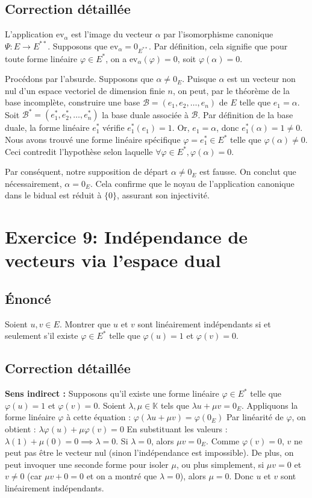 \documentclass{report}
\begin{document}
\section*{Correction détaillée}
L'application $\text{ev}_\alpha$ est l'image du vecteur $\alpha$ par l'isomorphisme canonique $\Psi : E \to E^{**}$.
Supposons que $\text{ev}_\alpha = 0_{E^{**}}$.
Par définition, cela signifie que pour toute forme linéaire $\varphi \in E^*$, on a $\text{ev}_\alpha(\varphi) = 0$, soit $\varphi(\alpha) = 0$.

Procédons par l'absurde. Supposons que $\alpha \neq 0_E$.
Puisque $\alpha$ est un vecteur non nul d'un espace vectoriel de dimension finie $n$, on peut, par le théorème de la base incomplète, construire une base $\mathcal{B} = (e_1, e_2, \dots, e_n)$ de $E$ telle que $e_1 = \alpha$.
Soit $\mathcal{B}^* = (e_1^*, e_2^*, \dots, e_n^*)$ la base duale associée à $\mathcal{B}$.
Par définition de la base duale, la forme linéaire $e_1^*$ vérifie $e_1^*(e_1) = 1$.
Or, $e_1 = \alpha$, donc $e_1^*(\alpha) = 1 \neq 0$.
Nous avons trouvé une forme linéaire spécifique $\varphi = e_1^* \in E^*$ telle que $\varphi(\alpha) \neq 0$.
Ceci contredit l'hypothèse selon laquelle $\forall \varphi \in E^*, \varphi(\alpha) = 0$.

Par conséquent, notre supposition de départ $\alpha \neq 0_E$ est fausse.
On conclut que nécessairement, $\alpha = 0_E$.
Cela confirme que le noyau de l'application canonique dans le bidual est réduit à $\{0\}$, assurant son injectivité.


\newpage
\chapter*{Exercice 9: Indépendance de vecteurs via l'espace dual}
\section*{Énoncé}
Soient $u, v \in E$. Montrer que $u$ et $v$ sont linéairement indépendants si et seulement s'il existe $\varphi \in E^*$ telle que $\varphi(u) = 1$ et $\varphi(v) = 0$.


\section*{Correction détaillée}
\textbf{Sens indirect :}
Supposons qu'il existe une forme linéaire $\varphi \in E^*$ telle que $\varphi(u) = 1$ et $\varphi(v) = 0$.
Soient $\lambda, \mu \in \mathbb{K}$ tels que $\lambda u + \mu v = 0_E$.
Appliquons la forme linéaire $\varphi$ à cette équation :
$\varphi(\lambda u + \mu v) = \varphi(0_E)$
Par linéarité de $\varphi$, on obtient :
$\lambda \varphi(u) + \mu \varphi(v) = 0$
En substituant les valeurs :
$\lambda(1) + \mu(0) = 0 \implies \lambda = 0$.
Si $\lambda = 0$, alors $\mu v = 0_E$. Comme $\varphi(v) = 0$, $v$ ne peut pas être le vecteur nul (sinon l'indépendance est impossible). De plus, on peut invoquer une seconde forme pour isoler $\mu$, ou plus simplement, si $\mu v = 0$ et $v \neq 0$ (car $\mu v + 0 = 0$ et on a montré que $\lambda = 0$), alors $\mu=0$.
Donc $u$ et $v$ sont linéairement indépendants.
\end{document}
